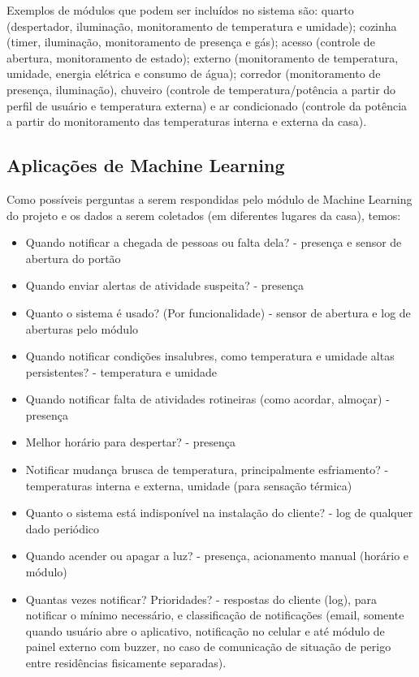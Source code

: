 Exemplos de módulos que podem ser incluídos no sistema são: quarto (despertador, iluminação, monitoramento de temperatura e umidade); cozinha (timer, iluminação, monitoramento de presença e gás); acesso (controle de abertura, monitoramento de estado); externo (monitoramento de temperatura, umidade, energia elétrica e consumo de água); corredor (monitoramento de presença, iluminação), chuveiro (controle de temperatura/potência a partir do perfil de usuário e temperatura externa) e ar condicionado (controle da potência a partir do monitoramento das temperaturas interna e externa da casa).

\subsection{Aplicações de Machine Learning}
Como possíveis perguntas a serem respondidas pelo módulo de Machine Learning do projeto e os dados a serem coletados (em diferentes lugares da casa), temos:

\begin{itemize}
\item Quando notificar a chegada de pessoas ou falta dela? - presença e sensor de abertura do portão
\item Quando enviar alertas de atividade suspeita? - presença
\item Quanto o sistema é usado? (Por funcionalidade) - sensor de abertura e log de aberturas pelo módulo
\item Quando notificar condições insalubres, como temperatura e umidade altas persistentes? - temperatura e umidade
\item Quando notificar falta de atividades rotineiras (como acordar, almoçar) - presença
\item Melhor horário para despertar? - presença
\item Notificar mudança brusca de temperatura, principalmente esfriamento? - temperaturas interna e externa, umidade (para sensação térmica)
\item Quanto o sistema está indisponível na instalação do cliente? - log de qualquer dado periódico
\item Quando acender ou apagar a luz? - presença, acionamento manual (horário e módulo)
\item Quantas vezes notificar? Prioridades? - respostas do cliente (log), para notificar o mínimo necessário, e classificação de notificações (email, somente quando usuário abre o aplicativo, notificação no celular e até módulo de painel externo com buzzer, no caso de comunicação de situação de perigo entre residências fisicamente separadas).
\end{itemize}

